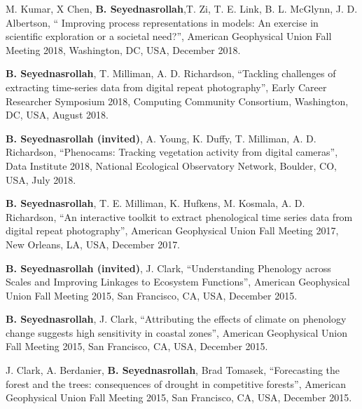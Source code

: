 \documentclass[10pt]{article}
\newenvironment{changemargin}[2]{%
  \begin{list}{}{%
 \setlength{\topsep}{0pt}%
 \setlength{\leftmargin}{#1}%
 \setlength{\rightmargin}{#2}%
 \setlength{\listparindent}{\parindent}%
 \setlength{\itemindent}{\parindent}%
 \setlength{\parsep}{\parskip}%
  }%
  \item[]}{\end{list}
}
\newenvironment{body} {
  \vspace*{-2pt}
  \begin{changemargin}{-0.5in}{-0.5in}
}
{\end{changemargin}
}
\begin{document}
\begin{body}
\begin{etaremune}
    \item M. Kumar, X Chen, \textbf{B. Seyednasrollah},T. Zi, T. E. Link, B. L. McGlynn, J. D. Albertson, `` Improving process representations in models: An exercise in scientific exploration or a societal need?'', American Geophysical Union Fall Meeting 2018, Washington, DC, USA, December 2018.\\
    \medskip


    \item \textbf{B. Seyednasrollah}, T. Milliman, A. D. Richardson, ``Tackling challenges of extracting time-series data from digital repeat photography'', Early Career Researcher Symposium 2018, Computing Community Consortium, Washington, DC, USA, August 2018.\\
    \medskip

    \item \textbf{B. Seyednasrollah (invited)}, A. Young, K. Duffy, T. Milliman, A. D. Richardson, ``Phenocams: Tracking vegetation activity from digital cameras'', Data Institute 2018, National Ecological Observatory Network, Boulder, CO, USA, July 2018.\\
    \medskip

    \item \textbf{B. Seyednasrollah}, T. E. Milliman, K. Hufkens, M. Kosmala, A. D. Richardson, ``An interactive toolkit to extract phenological time series data from digital repeat photography'', American Geophysical Union Fall Meeting 2017, New Orleans, LA, USA, December 2017.\\
    \medskip

    \item \textbf{B. Seyednasrollah (invited)}, J. Clark, ``Understanding Phenology across Scales and Improving Linkages to Ecosystem Functions'', American Geophysical Union Fall Meeting 2015, San Francisco, CA, USA, December 2015.\\
    \medskip

    \item \textbf{B. Seyednasrollah}, J. Clark, ``Attributing the effects of climate on phenology change suggests high sensitivity in coastal zones'', American Geophysical Union Fall Meeting 2015, San Francisco, CA, USA, December 2015.\\
    \medskip

    \item J. Clark, A. Berdanier, \textbf{B. Seyednasrollah}, Brad Tomasek, ``Forecasting the forest and the trees: consequences of drought in competitive forests'', American Geophysical Union Fall Meeting 2015, San Francisco, CA, USA, December 2015.\\
    \medskip


\end{etaremune}
\end{body}
\end{document}
